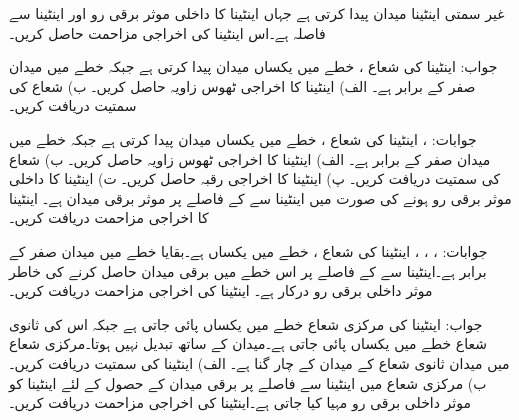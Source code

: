 \newpage
{}

غیر سمتی اینٹینا  میدان پیدا کرتی ہے جہاں اینٹینا کا داخلی موثر برقی رو  اور اینٹینا سے فاصلہ  ہے۔اس اینٹینا کی اخراجی مزاحمت حاصل کریں۔

جواب:
اینٹینا کی شعاع ،  خطے میں یکساں میدان پیدا کرتی ہے جبکہ  خطے میں میدان صفر کے برابر ہے۔ الف) اینٹینا کا اخراجی ٹھوس زاویہ  حاصل کریں۔ ب) شعاع کی سمتیت  دریافت کریں۔

جوابات: ، 
اینٹینا کی شعاع ،  خطے میں یکساں میدان پیدا کرتی ہے جبکہ  خطے میں میدان صفر کے برابر ہے۔ الف) اینٹینا کا اخراجی ٹھوس زاویہ  حاصل کریں۔ ب) شعاع کی سمتیت  دریافت کریں۔ پ) اینٹینا کا اخراجی رقبہ  حاصل کریں۔ ت) اینٹینا کا داخلی موثر برقی رو  ہونے کی صورت میں اینٹینا سے  کے فاصلے پر موثر برقی 
میدان  ہے۔ اینٹینا کا اخراجی مزاحمت  دریافت کریں۔



جوابات: ، ، ، 
اینٹینا کی شعاع ،  خطے میں یکساں ہے۔بقایا خطے میں میدان صفر کے برابر ہے۔اینٹینا سے  کے فاصلے پر اس خطے میں  برقی میدان حاصل کرنے کی خاطر  موثر داخلی برقی رو درکار ہے۔ اینٹینا کی اخراجی مزاحمت  دریافت کریں۔

جواب:
اینٹینا کی مرکزی شعاع   خطے میں یکساں پائی جاتی ہے جبکہ اس کی ثانوی شعاع  خطے میں یکساں پائی جاتی ہے۔میدان  کے ساتھ تبدیل نہیں ہوتا۔مرکزی شعاع میں میدان ثانوی شعاع کے میدان کے چار گنا ہے۔ الف) اینٹینا کی سمتیت  دریافت کریں۔ب) مرکزی شعاع میں اینٹینا سے  فاصلے پر  برقی میدان کے حصول کے لئے اینٹینا کو   موثر داخلی برقی رو مہیا کیا جاتی ہے۔اینٹینا کی اخراجی مزاحمت  دریافت کریں۔

